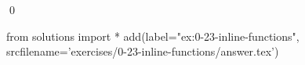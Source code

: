 
\begin{ex}
  \label{ex:0-23-inline-functions}
  
  \qed
\end{ex}
\begin{python0}
from solutions import *
add(label="ex:0-23-inline-functions",
    srcfilename='exercises/0-23-inline-functions/answer.tex')
\end{python0}
